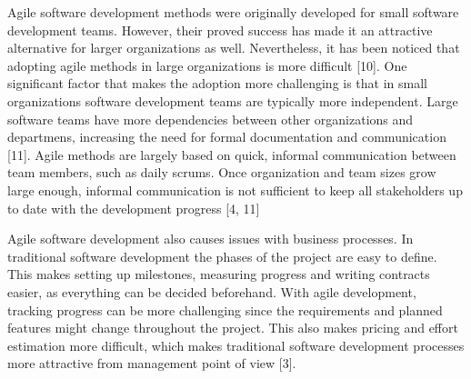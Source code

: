 Agile software development methods were originally developed for small
software development teams. However, their proved success has made it an
attractive alternative for larger organizations as well. Nevertheless,
it has been noticed that adopting agile methods in large organizations
is more difficult [10]. One significant factor
that makes the adoption more challenging is that in small organizations
software development teams are typically more independent. Large
software teams have more dependencies between other organizations
and departmens, increasing the need for formal documentation and
communication [11]. Agile methods are largely based
on quick, informal communication between team members, such as daily
scrums. Once organization and team sizes grow large enough, informal
communication is not sufficient to keep all stakeholders up to date with
the development progress [4, 11]

Agile software development also causes issues with business processes.
In traditional software development the phases of the project are easy
to define. This makes setting up milestones, measuring progress and
writing contracts easier, as everything can be decided beforehand. With
agile development, tracking progress can be more challenging since the
requirements and planned features might change throughout the project.
This also makes pricing and effort estimation more difficult, which
makes traditional software development processes more attractive from
management point of view [3].
